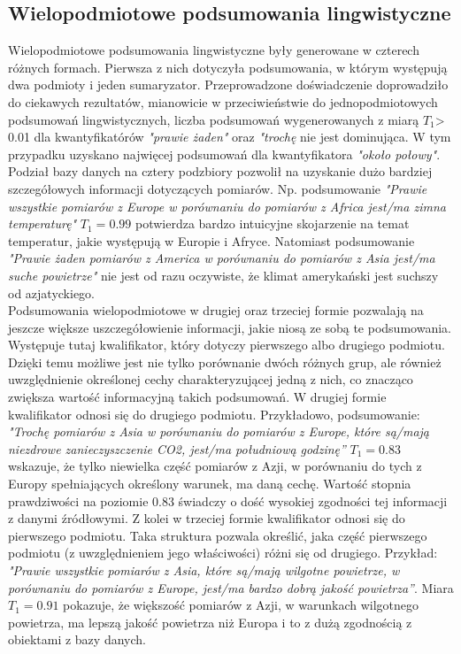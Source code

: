 \documentclass{article}
\begin{document}
\subsection{Wielopodmiotowe podsumowania lingwistyczne}
Wielopodmiotowe podsumowania lingwistyczne były generowane w czterech różnych formach. Pierwsza z nich dotyczyła podsumowania, w którym występują dwa podmioty i jeden sumaryzator. Przeprowadzone doświadczenie doprowadziło do ciekawych rezultatów, mianowicie w przeciwieństwie do jednopodmiotowych podsumowań lingwistycznych, liczba podsumowań wygenerowanych z miarą \(T_1\)> 0.01 dla kwantyfikatórów \textit{"prawie żaden"} oraz \textit{"trochę} nie jest dominująca. W tym przypadku uzyskano najwięcej podsumowań dla kwantyfikatora \textit{"około połowy"}. Podział bazy danych na cztery podzbiory pozwolił na uzyskanie dużo bardziej szczegółowych informacji dotyczących pomiarów. Np. podsumowanie \textit{"Prawie wszystkie pomiarów z Europe w porównaniu do pomiarów z Africa jest/ma zimna temperaturę"} \(T_1 = 0.99\) potwierdza bardzo intuicyjne skojarzenie na temat temperatur, jakie występują  w Europie i Afryce. Natomiast podsumowanie \textit{"Prawie żaden pomiarów z America w porównaniu do pomiarów z Asia jest/ma suche powietrze"} nie jest od razu oczywiste, że klimat amerykański jest suchszy od azjatyckiego. \\
Podsumowania wielopodmiotowe w drugiej oraz trzeciej formie pozwalają na jeszcze większe uszczegółowienie informacji, jakie niosą ze sobą te podsumowania. Występuje tutaj kwalifikator, który dotyczy pierwszego albo drugiego podmiotu. Dzięki temu możliwe jest nie tylko porównanie dwóch różnych grup, ale również uwzględnienie określonej cechy charakteryzującej jedną z nich, co znacząco zwiększa wartość informacyjną takich podsumowań. W drugiej formie kwalifikator odnosi się do drugiego podmiotu. Przykładowo, podsumowanie: \textit{"Trochę pomiarów z Asia w porównaniu do pomiarów z Europe, które są/mają niezdrowe zanieczyszczenie CO2, jest/ma południową godzinę”} \(T_1 = 0.83\)
wskazuje, że tylko niewielka część pomiarów z Azji, w porównaniu do tych z Europy spełniających określony warunek, ma daną cechę. Wartość stopnia prawdziwości na poziomie 0.83 świadczy o dość wysokiej zgodności tej informacji z danymi źródłowymi. Z kolei w trzeciej formie kwalifikator odnosi się do pierwszego podmiotu. Taka struktura pozwala określić, jaka część pierwszego podmiotu (z uwzględnieniem jego właściwości) różni się od drugiego. Przykład: \textit{"Prawie wszystkie pomiarów z Asia, które są/mają wilgotne powietrze, w porównaniu do pomiarów z Europe, jest/ma bardzo dobrą jakość powietrza”}. Miara \(T_1 = 0.91\) pokazuje, że większość pomiarów z Azji, w warunkach wilgotnego powietrza, ma lepszą jakość powietrza niż Europa i to z dużą zgodnością z obiektami z bazy danych. \\
\end{document}
